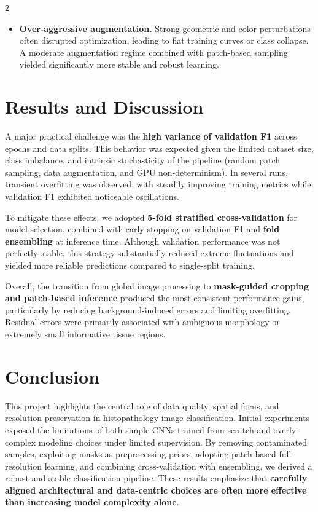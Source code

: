 \documentclass[11pt]{article}
\begin{document}
\begin{multicols}{2}
\begin{itemize}[leftmargin=*, itemsep=2pt]
    \item \textbf{Over-aggressive augmentation.}
    Strong geometric and color perturbations often disrupted optimization, leading to flat training curves or class collapse.
    A moderate augmentation regime combined with patch-based sampling yielded significantly more stable and robust learning.
\end{itemize}

\vspace{-1.5em}

\section{Results and Discussion}

A major practical challenge was the \textbf{high variance of validation F1} across epochs and data splits.
This behavior was expected given the limited dataset size, class imbalance, and intrinsic stochasticity of the pipeline
(random patch sampling, data augmentation, and GPU non-determinism).
In several runs, transient overfitting was observed, with steadily improving training metrics while validation F1 exhibited noticeable oscillations.

To mitigate these effects, we adopted \textbf{5-fold stratified cross-validation} for model selection, combined with
early stopping on validation F1 and \textbf{fold ensembling} at inference time.
Although validation performance was not perfectly stable, this strategy substantially reduced extreme fluctuations
and yielded more reliable predictions compared to single-split training.

Overall, the transition from global image processing to \textbf{mask-guided cropping and patch-based inference}
produced the most consistent performance gains, particularly by reducing background-induced errors and limiting overfitting.
Residual errors were primarily associated with ambiguous morphology or extremely small informative tissue regions.

\vspace{-.8em}

\section{Conclusion}

This project highlights the central role of data quality, spatial focus, and resolution preservation in histopathology image classification.
Initial experiments exposed the limitations of both simple CNNs trained from scratch and overly complex modeling choices under limited supervision.
By removing contaminated samples, exploiting masks as preprocessing priors, adopting patch-based full-resolution learning, and combining cross-validation with ensembling, we derived a robust and stable classification pipeline.
These results emphasize that \textbf{carefully aligned architectural and data-centric choices are often more effective than increasing model complexity alone}.

    \end{multicols}
\end{document}
